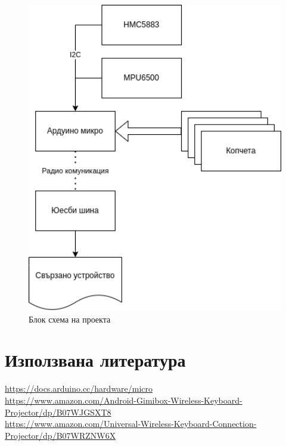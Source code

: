 \documentclass[a4paper,14pt]{extreport}
\begin{document}
\begin{figure}[h]
	\centering
	\includegraphics[width=1\textwidth]{block-scheme}
	\caption{Блок схема на проекта}
\end{figure}

\chapter*{Използвана литература}
\url{https://docs.arduino.cc/hardware/micro} \\
\url{https://www.amazon.com/Android-Gimibox-Wireless-Keyboard-Projector/dp/B07WJGSXT8} \\
\url{https://www.amazon.com/Universal-Wireless-Keyboard-Connection-Projector/dp/B07WRZNW6X} \\

\tableofcontents
\end{document}
